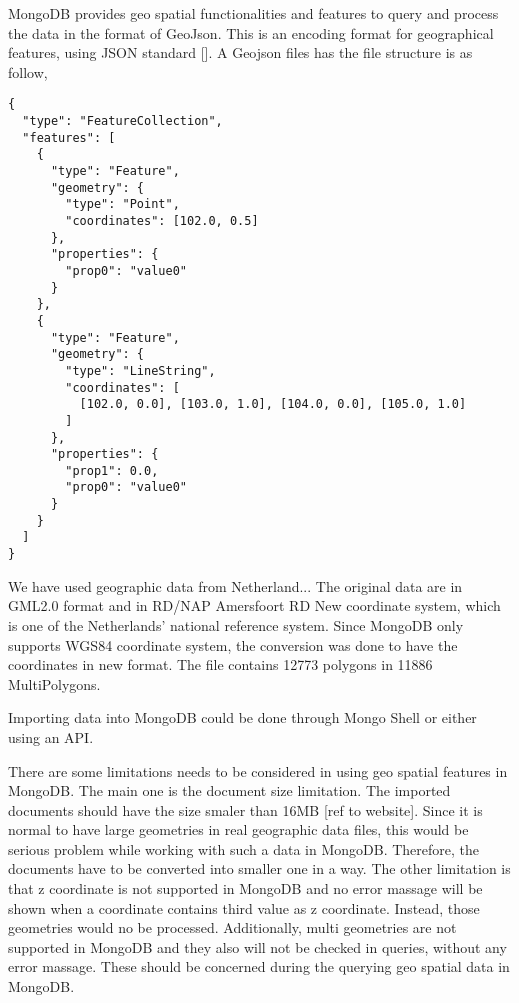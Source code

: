 MongoDB provides geo spatial functionalities and features to query and process the data in the format of GeoJson. This is an encoding format for geographical features, using JSON standard []. A Geojson files has the file structure is as follow,
\begin{verbatim}
{
  "type": "FeatureCollection",
  "features": [
    {
      "type": "Feature",
      "geometry": {
        "type": "Point",
        "coordinates": [102.0, 0.5]
      },
      "properties": {
        "prop0": "value0"
      }
    },
    {
      "type": "Feature",
      "geometry": {
        "type": "LineString",
        "coordinates": [
          [102.0, 0.0], [103.0, 1.0], [104.0, 0.0], [105.0, 1.0]
        ]
      },
      "properties": {
        "prop1": 0.0,
        "prop0": "value0"
      }
    }
  ]
}
\end{verbatim}


We have used geographic data from Netherland...
The original data are in GML2.0 format and in RD/NAP Amersfoort RD New coordinate system, which is one of the Netherlands' national reference system. Since MongoDB only supports WGS84 coordinate system, the conversion was done to have the coordinates in new format. The file contains 12773 polygons in 11886 MultiPolygons. 

Importing data into MongoDB could be done through Mongo Shell or either using an API.

There are some limitations needs to be considered in using geo spatial features in MongoDB. The main one is the document size limitation. The imported documents should have the size smaler than 16MB [ref to website]. Since it is normal to have large geometries in real geographic data files, this would be serious problem while working with such a data in MongoDB. Therefore, the documents have to be converted into smaller one in a way. The other limitation is that z coordinate is not supported in MongoDB and no error massage will be shown when a coordinate contains third value as z coordinate. Instead, those geometries would no be processed. Additionally, multi geometries are not supported in MongoDB and they also will not be checked in queries, without any error massage. These should be concerned during the querying geo spatial data in MongoDB.

